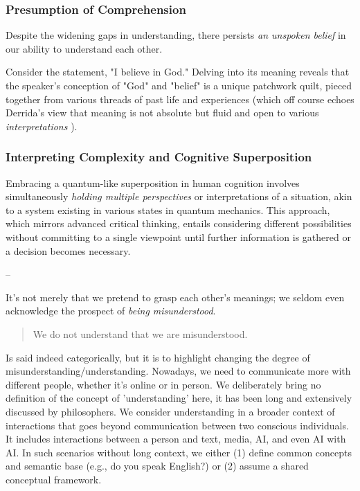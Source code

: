 \documentclass[11pt,a4]{article}
\begin{document}
        \subsubsection{Presumption of Comprehension}
        Despite the widening gaps in understanding, there persists
        \textit{an unspoken belief} in our ability to understand each other.

        Consider the statement, "I believe in God." Delving into its meaning reveals that the speaker's
        conception of "God" and "belief" is a unique patchwork quilt, pieced together from various threads
        of past life and experiences (which off course echoes Derrida's view that meaning is not absolute
        but fluid and open to various \textit{interpretations} \cite{Deconstruction}).


        \subsubsection{Interpreting Complexity and Cognitive Superposition}

        Embracing a quantum-like superposition in human cognition involves
        simultaneously \textit{holding multiple perspectives} or interpretations of a situation, akin to a
        system existing in various states in quantum mechanics. This approach, which mirrors advanced
        critical thinking, entails considering different possibilities without committing to a single
        viewpoint until further information is gathered or a decision becomes necessary.

        --

        \par
        It's not merely that we pretend to grasp each other's meanings; we seldom even acknowledge
        the prospect of \textit{being misunderstood}.

        \begin{quote}
            We do not understand that we are misunderstood.
        \end{quote}

        Is said indeed categorically, but it is to highlight changing the degree
        of misunderstanding/understanding. Nowadays, we need to communicate more with different people,
        whether it's online or in person. We deliberately bring no definition of the concept
        of 'understanding' here, it has been long and extensively
        discussed by philosophers.
        We consider understanding in a broader context of interactions
        that goes beyond communication between two conscious individuals. It includes interactions
        between a person and text, media, AI,
        and even AI with AI. In such scenarios
        without long context, we either (1) define common concepts and semantic
        base (e.g., do you speak English?) or (2) assume a
        shared conceptual framework.
\end{document}
